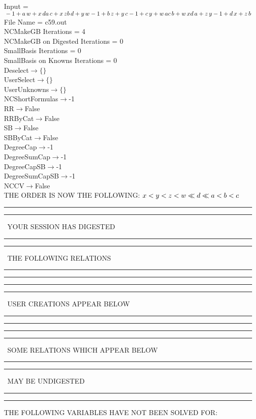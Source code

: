 \documentclass[rep10,leqno]{report}
\begin{document}
\normalsize
\baselineskip=12pt
\noindent
Input = 
$
\\-1 + a\,
 w + x\,
 d\\
a\,
 c + x\,
 z\\
b\,
 d + y\,
 w\\
-1 + b\,
 z + y\,
 c\\
-1 + c\,
 y + w\,
 a\\
c\,
 b + w\,
 x\\
d\,
 a + z\,
 y\\
-1 + d\,
 x + z\,
 b\\
$
File Name = c59.out\\
NCMakeGB Iterations = 4\\
NCMakeGB on Digested Iterations = 0\\
SmallBasis Iterations = 0\\
SmallBasis on Knowns Iterations = 0\\
Deselect$\rightarrow \{\}$\\
UserSelect$\rightarrow \{\}$\\
UserUnknowns$\rightarrow \{\}$\\
NCShortFormulas$\rightarrow$-1\\
RR$\rightarrow $False\\
RRByCat$\rightarrow $False\\
SB$\rightarrow $False\\
SBByCat$\rightarrow $False\\
DegreeCap$\rightarrow $-1\\
DegreeSumCap$\rightarrow $-1\\
DegreeCapSB$\rightarrow $-1\\
DegreeSumCapSB$\rightarrow $-1\\
NCCV$\rightarrow $False\\
THE ORDER IS NOW THE FOLLOWING:\hfil\break
$
x<y<z<w\ll
d\ll
a<b<c\\
$
\rule[2pt]{6in}{4pt}\hfil\break
\rule[2pt]{1.879in}{4pt}
\ YOUR SESSION HAS DIGESTED\ 
\rule[2pt]{1.879in}{4pt}\hfil\break
\rule[2pt]{1.923in}{4pt}
\ THE FOLLOWING RELATIONS\ 
\rule[2pt]{1.923in}{4pt}\hfil\break
\rule[2pt]{6in}{4pt}\hfil\break
\rule[2pt]{6in}{1pt}\hfil\break
\rule[2.5pt]{1.701in}{1pt}
\ USER CREATIONS APPEAR BELOW\ 
\rule[2.5pt]{1.701in}{1pt}\hfil\break
\rule[2pt]{6in}{1pt}\hfil\break
\rule[2pt]{6in}{4pt}\hfil\break
\rule[2pt]{1.45in}{4pt}
\ SOME RELATIONS WHICH APPEAR BELOW\ 
\rule[2pt]{1.45in}{4pt}\hfil\break
\rule[2pt]{2.18in}{4pt}
\ MAY BE UNDIGESTED\ 
\rule[2pt]{2.18in}{4pt}\hfil\break
\rule[2pt]{6in}{4pt}\hfil\break
THE FOLLOWING VARIABLES HAVE NOT BEEN SOLVED FOR:\hfil\break
\end{document}

